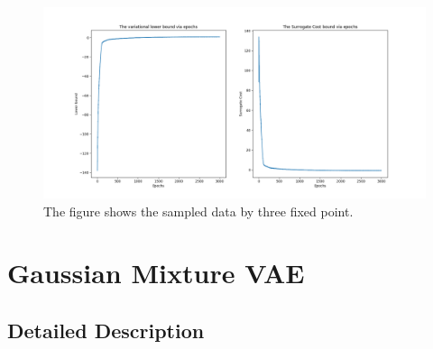 \documentclass[a4paper]{article}
\begin{document}
\begin{figure}[!htbp]
\begin{center}
\includegraphics[width=18cm]{imgs/cost_lb.png}
\end{center}
\caption{The figure shows the sampled data by three fixed point.}\label{datavis}
\end{figure}






\section{Gaussian Mixture VAE}

\subsection{Detailed Description}
\end{document}
